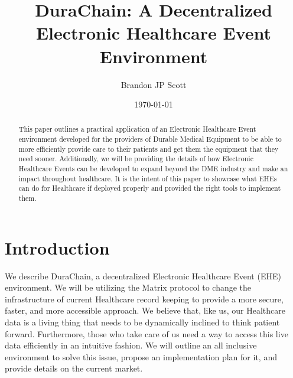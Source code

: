 \documentclass[preprint,pre,floats,aps,amsmath,amssymb]{revtex4-1}
\begin{document}
\title{DuraChain: A Decentralized Electronic Healthcare Event Environment}
\author{Brandon JP Scott}
\date{\today}

\begin{abstract}
This paper outlines a practical application of an Electronic Healthcare Event environment developed for the providers of Durable Medical Equipment to be able to more efficiently provide care to their patients and get them the equipment that they need sooner. Additionally, we will be providing the details of how Electronic Healthcare Events can be developed to expand beyond the DME industry and make an impact throughout healthcare. It is the intent of this paper to showcase what EHEs can do for Healthcare if deployed properly and provided the right tools to implement them.
\end{abstract}

\maketitle

\section{Introduction}
We describe DuraChain, a decentralized Electronic Healthcare Event (EHE) environment. We will be utilizing the Matrix protocol to change the infrastructure of current Healthcare record keeping to provide a more secure, faster, and more accessible approach. We believe that, like us, our Healthcare data is a living thing that needs to be dynamically inclined to think patient forward. Furthermore, those who take care of us need a way to access this live data efficiently in an intuitive fashion. We will outline an all inclusive environment to solve this issue, propose an implementation plan for it, and provide details on the current market.
\end{document}
